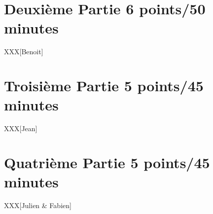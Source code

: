 \section{Deuxi\`eme Partie \hfill{} \scriptsize{6 points/50 minutes}}

XXX[Benoit]

%
%

\section{Troisi\`eme Partie \hfill{} \scriptsize{5 points/45 minutes}}

XXX[Jean]

%
%

\section{Quatri\`eme Partie \hfill{} \scriptsize{5 points/45 minutes}}

XXX[Julien \& Fabien]


